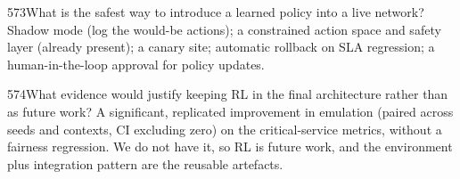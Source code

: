 \begin{qa}{573}{What is the safest way to introduce a learned policy into a live network?}
Shadow mode (log the would-be actions); a constrained action space and safety layer (already present); a canary site;
automatic rollback on SLA regression; a human-in-the-loop approval for policy updates.
\end{qa}

\begin{qa}{574}{What evidence would justify keeping RL in the final architecture rather than as future work?}
A significant, replicated improvement in emulation (paired across seeds and contexts, CI excluding zero) on the
critical-service metrics, without a fairness regression. We do not have it, so RL is future work, and the
environment plus integration pattern are the reusable artefacts.
\end{qa}
